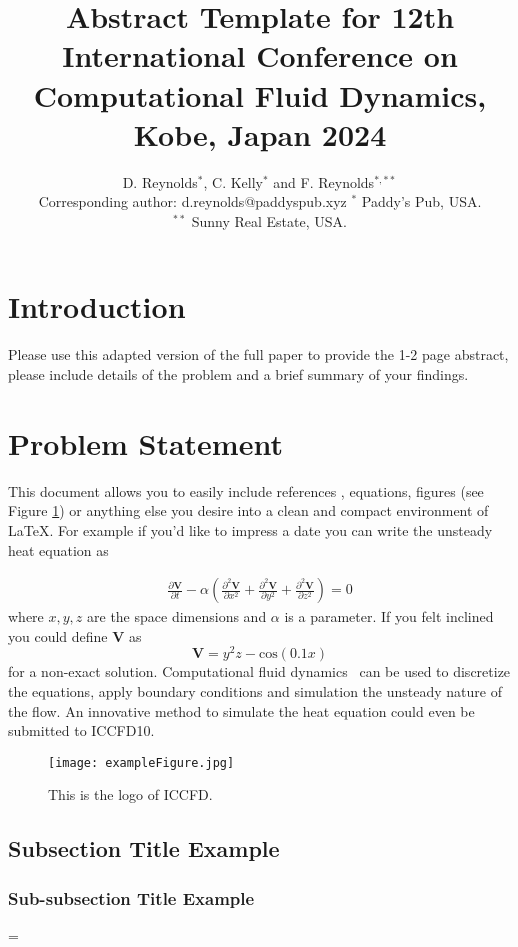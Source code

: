 \documentclass[10pt]{article}
\title{
\bf Abstract Template for 12th International Conference on Computational
Fluid Dynamics, Kobe, Japan 2024
}
\author{
D. Reynolds$^{*}$, C. Kelly$^{*}$ and F. Reynolds$^{*,**}$\\
Corresponding author: d.reynolds@paddyspub.xyz
$^{*}$ Paddy's Pub, USA.\\
$^{**}$ Sunny Real Estate, USA.
}
\date{}
\newcommand{\laeq}[1]{\label{eq:#1}}
\newcommand{\figu}[1]{\ref{fig:#1}}
\newcommand{\lafi}[1]{\label{fig:#1}}
\begin{document}
\maketitle
\afterpage{\fancyhead{}}

\centerline{
}
\vskip0.5cm 

\section{Introduction}
Please use this adapted version of the full paper to provide the 1-2 page abstract, please include details of the problem and a brief summary of your findings. 


\section{Problem Statement}
This document allows you to easily include references \cite{book,journalpaper}, equations, figures (see Figure \figu{logo}) or anything else you
desire into a clean and compact environment of \LaTeX.  For example if you'd like to impress a date you can write
the unsteady heat equation as

\begin{eqnarray}
\frac{\partial \mathbf{V}}{\partial t} - \alpha \left( \frac{\partial^2 \mathbf{V}}{\partial x^2} +
       \frac{\partial^2 \mathbf{V}}{\partial y^2} +
       \frac{\partial^2 \mathbf{V}}{\partial z^2} \right)
= 0
\laeq{heat}
\end{eqnarray}
where $x, y, z$ are the space dimensions and $\alpha$ is a parameter.  If you felt inclined you could define $\mathbf{V}$ as
%
$$\mathbf{V} = y^2 z - \text{cos}(0.1 x)$$
%
for a non-exact solution.  Computational fluid dynamics~\cite{paper} can be used to discretize the equations, apply boundary conditions and 
simulation the unsteady nature of the flow.  An innovative method to simulate the heat equation could even be submitted to ICCFD10.

\begin{figure}[H]
  \centering
  \texttt{[image: exampleFigure.jpg]}
  \caption{This is the logo of ICCFD.}
  \lafi{logo}
\end{figure}


\subsection{Subsection Title Example}

\subsubsection{Sub-subsection Title Example}



\bibspacing=


\end{document}
